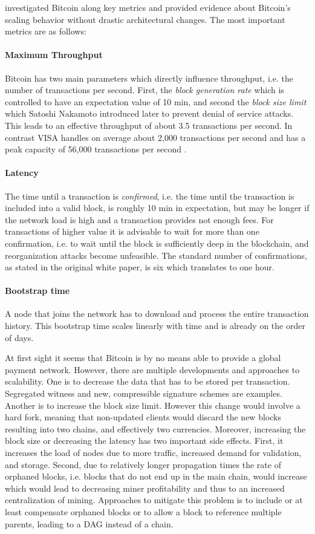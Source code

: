 \cite{croman2016scaling} investigated Bitcoin along key metrics and provided evidence about Bitcoin's scaling behavior without drastic architectural changes.
The most important metrics are as follows:
\paragraph{Maximum Throughput} 
Bitcoin has two main parameters which directly influence throughput, i.e. the number of transactions per second. First, the \emph{block generation rate} which is controlled to have an expectation value of 10 min, and second the \emph{block size limit} which Satoshi Nakamoto introduced later to prevent denial of service attacks. This leads to an effective throughput of about 3.5 transactions per second. In contrast VISA handles on average about 2,000 transactions per second and has a peak capacity of 56,000 transactions per second \parencite{visa}. 
\paragraph{Latency} The time until a transaction is \emph{confirmed}, i.e. the time until the transaction is included into a valid block, is roughly 10 min in expectation, but may be longer if the network load is high and a transaction provides not enough fees. For transactions of higher value it is advisable to wait for more than one confirmation, i.e. to wait until the block is sufficiently deep in the blockchain, and reorganization attacks become unfeasible. The standard number of confirmations, as stated in the original white paper, is six which translates to one hour. 
\paragraph{Bootstrap time} A node that joins the network has to download and process the entire transaction history. This bootstrap time scales linearly with time and is already on the order of days.

At first sight it seems that Bitcoin is by no means able to provide a global payment network. However, there are multiple developments and approaches to scalability. One is to decrease the data that has to be stored per transaction. Segregated witness \parencite{bip141} and new, compressible signature schemes are examples. Another is to increase the block size limit. However this change would involve a hard fork, meaning that non-updated clients would discard the new blocks resulting into two chains, and effectively two currencies. Moreover, increasing the block size or decreasing the latency has two important side effects. First, it increases the load of nodes due to more traffic, increased demand for validation, and storage. Second, due to relatively longer propagation times the rate of orphaned blocks, i.e. blocks that do not end up in the main chain, would increase which would lead to decreasing miner profitability and thus to an increased centralization of mining. Approaches to mitigate this problem is to include or at least compensate orphaned blocks \parencite{kiayias2016trees,Lewenberg2015,Sompolinsky2015} or to allow a block to reference multiple parents, leading to a \ac{DAG} instead of a chain.


